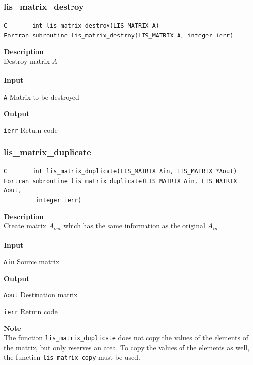\documentclass[a4paper]{article}
\newcommand{\namelistlabel}[1]{\mbox{#1}\hfill}
\newenvironment{namelist}[1]{%
 \begin{list}{}
  {\let\makelabel\namelistlabel
  \settowidth{\labelwidth}{#1}
  \setlength{\leftmargin}{1.1\labelwidth}}
}{%
\end{list}}
\begin{document}
  \subsubsection{lis\_matrix\_destroy}
\begin{screen}
\verb|C       int lis_matrix_destroy(LIS_MATRIX A)|\\
\verb|Fortran subroutine lis_matrix_destroy(LIS_MATRIX A, integer ierr)|
\end{screen}
{\bf Description}\\
\indent
Destroy matrix $A$
\\ \\
\noindent
{\bf Input}
\begin{namelist}{XXXXXXXXXXXXXXXXXXXX}
\item[\tt A] Matrix to be destroyed
\end{namelist}
{\bf Output}
\begin{namelist}{XXXXXXXXXXXXXXXXXXXX}
\item[\tt ierr] Return code
\end{namelist}
\newpage
  \subsubsection{lis\_matrix\_duplicate}
\begin{screen}
\verb|C       int lis_matrix_duplicate(LIS_MATRIX Ain, LIS_MATRIX *Aout)|
\verb|Fortran subroutine lis_matrix_duplicate(LIS_MATRIX Ain, LIS_MATRIX Aout,|\\
\verb|         integer ierr)|
\end{screen}
{\bf Description}\\
\indent
Create matrix $A_{out}$ which has the same information as the
original $A_{in}$
\\ \\
\noindent
{\bf Input}
\begin{namelist}{XXXXXXXXXXXXXXXXXXXX}
\item[\tt Ain] Source matrix
\end{namelist}
{\bf Output}
\begin{namelist}{XXXXXXXXXXXXXXXXXXXX}
\item[\tt Aout] Destination matrix
\item[\tt ierr] Return code
\end{namelist}
{\bf Note}\\
\indent
The function \verb|lis_matrix_duplicate| does not copy the values of 
the elements of the matrix, but only reserves an area. 
To copy the values of the elements as well, the function \verb|lis_matrix_copy| must be used.
\end{document}
